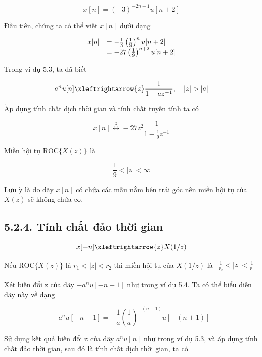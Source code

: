 \documentclass[
  10
]{article}
\begin{document}
\[
x [ n ] = (- 3) ^ {- 2 n - 1} u [ n + 2 ]
\]

Đầu tiên, chúng ta có thể viết \(x [ n ]\) dưới dạng

\[
\begin{array}{r l} x [ n ] & = - \frac {1}{3} \left(\frac {1}{9}\right) ^ {n} u [ n + 2 ] \\ & = - 2 7 \left(\frac {1}{9}\right) ^ {n + 2} u [ n + 2 ] \end{array}
\]

Trong ví dụ 5.3, ta đã biết

\[
a ^ {n} u [ n ] \xleftrightarrow {z} \frac {1}{1 - a z ^ {- 1}}, \quad | z | > | a |
\]

\(\mathrm { { \acute { A } p } }\) dụng tính chất dịch thời gian và tính
chất tuyến tính ta có

\[
x [ n ] \stackrel {z} {\longleftrightarrow} - 2 7 z ^ {2} \frac {1}{1 - \frac {1}{9} z ^ {- 1}}
\]

Miền hội tụ \(\mathrm { R O C } \{ X ( z ) \}\) là

\[
\frac {1}{9} <   | z | <   \infty
\]

Lưu \(\acute { \mathrm { y } }\) là do dãy \(x [ n ]\) có chứa các mẫu
nằm bên trái \(\mathrm { g } \acute { \mathrm { o c } }\) nên miền hội
tụ của \(X ( z )\) sẽ không chứa \(\infty .\)

\subsection{5.2.4. Tính chất đảo thời
gian}\label{tuxednh-chux1ea5t-ux111ux1ea3o-thux1eddi-gian}

\[
x [ - n ] \xleftrightarrow {z} X (1 / z)
\]

Nếu \(\mathrm { R O C } \{ X ( z ) \}\) là
\(r _ { 1 } < | z | < r _ { 2 }\) thì miền hội tụ của \(X ( 1 / z )\) là
\(\begin{array} { r } { \frac { 1 } { r _ { 2 } } < | z | < \frac { 1 } { r _ { 1 } } } \end{array}\)

Xét biến đổi z của dãy \(- a ^ { n } u [ - n - 1 ]\) như trong ví dụ
5.4. Ta có thể biểu diễn dãy này về dạng

\[
- a ^ {n} u [ - n - 1 ] = - \frac {1}{a} \left(\frac {1}{a}\right) ^ {- (n + 1)} u [ - (n + 1) ]
\]

Sử dụng kết quả biến đổi z của dãy \(a ^ { n } u [ n ]\) như trong ví dụ
5.3, và áp dụng tính chất đảo thời gian, sau đó là tính chất dịch thời
gian, ta có
\end{document}
